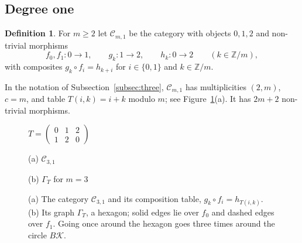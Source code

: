 \documentclass[12pt]{amsart}
\theoremstyle{definition}
\newtheorem{definition}[teo]{Definition}
\theoremstyle{remark}
\newcommand{\CC}{\mathcal{C}}
\newcommand{\co}{\colon}
\newcommand{\Z}{\mathbb{Z}}
\newcommand{\K}{\mathcal{K}}
\newcommand{\st}{\mathrm{star}}
\begin{document}
\subsection{Degree one}\label{subsec:moore-degree-one}

\begin{definition}\label{def:Cm1}
For $m\ge2$ let $\CC_{m,1}$ be the category with objects $0,1,2$ and non-trivial morphisms
\[
f_0,f_1\co0\to1,\qquad g_k\co1\to2,\qquad h_k\co0\to2\qquad(k\in\Z/m),
\]
with composites $g_k\circ f_i=h_{k+i}$ for $i\in\{0,1\}$ and $k\in\Z/m$.
\end{definition}

In the notation of Subsection~\ref{subsec:three}, $\CC_{m,1}$ has multiplicities $(2,m)$, $c=m$, and table $T(i,k)=i+k$ modulo $m$; see Figure~\ref{fig:Cm1}(a). It has $2m+2$ non-trivial morphisms.

\begin{figure}[ht]
\centering
\begin{minipage}[b]{0.55\textwidth}
\centering
{}

$T=\begin{pmatrix}0&1&2\\1&2&0\end{pmatrix}$

\smallskip
(a) $\CC_{3,1}$
\end{minipage}
\hfill
\begin{minipage}[b]{0.4\textwidth}
\centering
{}

\smallskip
(b) $\Gamma_T$ for $m=3$
\end{minipage}
\caption{(a) The category $\CC_{3,1}$ and its composition table, $g_k\circ f_i=h_{T(i,k)}$. (b) Its graph $\Gamma_T$, a hexagon; solid edges lie over $f_0$ and dashed edges over $f_1$. Going once around the hexagon goes three times around the circle $B\K$.}
\label{fig:Cm1}
\end{figure}
\end{document}

